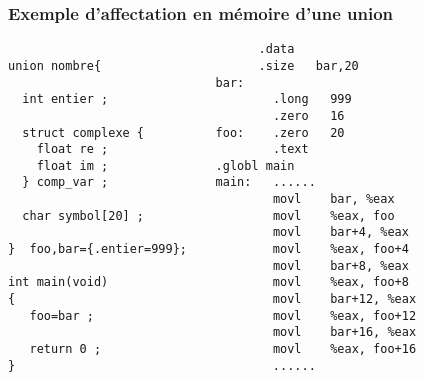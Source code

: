 \begin{frame}[fragile]
  \frametitle{Exemple d'affectation en m\'emoire d'une union}%
\begin{verbatim}
                                   .data                
union nombre{                      .size   bar,20       
                             bar:                         
  int entier ;                       .long   999          
                                     .zero   16           
  struct complexe {          foo:    .zero   20           
    float re ;                       .text                
    float im ;               .globl main                  
  } comp_var ;               main:   ......               
                                     movl    bar, %eax    
  char symbol[20] ;                  movl    %eax, foo    
                                     movl    bar+4, %eax  
}  foo,bar={.entier=999};            movl    %eax, foo+4  
                                     movl    bar+8, %eax  
int main(void)                       movl    %eax, foo+8  
{                                    movl    bar+12, %eax 
   foo=bar ;                         movl    %eax, foo+12 
                                     movl    bar+16, %eax 
   return 0 ;                        movl    %eax, foo+16 
}                                    ......               
\end{verbatim}
\end{frame}
